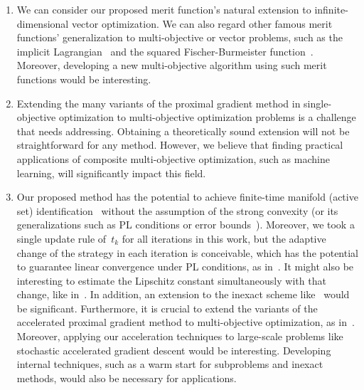 \documentclass[../main]{subfiles}
\begin{document}
\begin{enumerate}
    \item We can consider our proposed merit function's natural extension to infinite-dimensional vector optimization.
          We can also regard other famous merit functions' generalization to multi-objective or vector problems, such as the implicit Lagrangian~\cite{Mangasarian1993} and the squared Fischer-Burmeister function~\cite{Kanzow1996}.
          Moreover, developing a new multi-objective algorithm using such merit functions would be interesting.

    \item Extending the many variants of the proximal gradient method in single-objective optimization to multi-objective optimization problems is a challenge that needs addressing.
          Obtaining a theoretically sound extension will not be straightforward for any method.
          However, we believe that finding practical applications of composite multi-objective optimization, such as machine learning, will significantly impact this field.

    \item Our proposed method has the potential to achieve finite-time manifold (active set) identification~\cite{Sun2019} without the assumption of the strong convexity (or its generalizations such as PL conditions or error bounds~\cite{Karimi2016}).
          Moreover, we took a single update rule of~$t_k$ for all iterations in this work, but the adaptive change of the strategy in each iteration is conceivable, which has the potential to guarantee linear convergence under PL conditions, as in~\cite{Aujol2021}.
          It might also be interesting to estimate the Lipschitz constant simultaneously with that change, like in~\cite{Scheinberg2014}.
          In addition, an extension to the inexact scheme like~\cite{Villa2013} would be significant.
          Furthermore, it is crucial to extend the variants of the accelerated proximal gradient method to multi-objective optimization, as in~\cite{Nishimura2022,Chen2022}.
          Moreover, applying our acceleration techniques to large-scale problems like stochastic accelerated gradient descent would be interesting.
          Developing internal techniques, such as a warm start for subproblems and inexact methods, would also be necessary for applications.
\end{enumerate}
\end{document}
